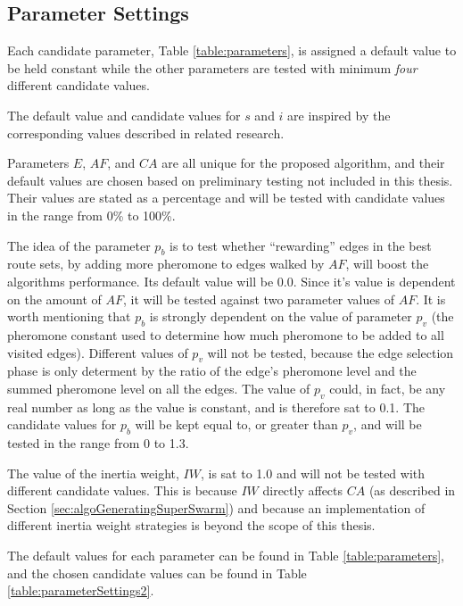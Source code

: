 \subsection{Parameter Settings}
\label{subsec:parameterSettings_setup}
Each candidate parameter, Table \vref{table:parameters}, is assigned a default value to be held constant while the other parameters are tested with minimum \textit{four} different candidate values. 

The default value and candidate values for $s$ and $i$ are inspired by the corresponding values described in related research\citep{salehi-nezhad07, poorzahedy11, sedighpour14, kechagiopoulos14}.

Parameters $E$, $AF$, and $CA$ are all unique for the proposed algorithm, and their default values are chosen based on preliminary testing not included in this thesis. Their values are stated as a percentage and will be tested with candidate values in the range from 0\% to 100\%. %

The idea of the parameter $p_b$ is to test whether ``rewarding'' edges in the best route sets, by adding more pheromone to edges walked by $AF$, will boost the algorithms performance. Its default value will be 0.0. Since it's value is dependent on the amount of $AF$, it will be tested against two parameter values of $AF$. It is worth mentioning that $p_ b$ is strongly dependent on the value of parameter $p_v$ (the pheromone constant used to determine how much pheromone to be added to all visited edges). Different values of $p_v$ will not be tested, because the edge selection phase is only determent by the ratio of the edge's pheromone level and the summed pheromone level on all the edges. The value of $p_v$ could, in fact, be any real number as long as the value is constant, and is therefore sat to 0.1. The candidate values for $p_b$ will be kept equal to, or greater than $p_v$, and will be tested in the range from 0 to 1.3. 

The value of the inertia weight, $IW$, is sat to 1.0 and will not be tested with different candidate values. This is because $IW$ directly affects $CA$ (as described in Section \vref{sec:algoGeneratingSuperSwarm}) and because an implementation of different inertia weight strategies is beyond the scope of this thesis. 

The default values for each parameter can be found in Table \vref{table:parameters}, and the chosen candidate values can be found in Table \vref{table:parameterSettings2}.


